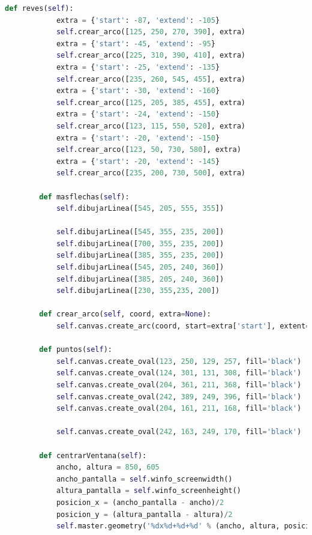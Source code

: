 \begin{lstlisting}[language=Python]
	    def reves(self):
	        extra = {'start': -87, 'extend': -105}
	        self.crear_arco([125, 250, 270, 390], extra)
	        extra = {'start': -45, 'extend': -95}
	        self.crear_arco([225, 310, 390, 410], extra)
	        extra = {'start': -25, 'extend': -135}
	        self.crear_arco([235, 260, 545, 455], extra)
	        extra = {'start': -30, 'extend': -160}
	        self.crear_arco([125, 205, 385, 455], extra)
	        extra = {'start': -24, 'extend': -150}
	        self.crear_arco([123, 115, 550, 520], extra)
	        extra = {'start': -20, 'extend': -150}
	        self.crear_arco([123, 50, 730, 580], extra)
	        extra = {'start': -20, 'extend': -145}
	        self.crear_arco([235, 200, 730, 500], extra)

	    def masflechas(self):
	        self.dibujarLinea([545, 205, 555, 355])

	        self.dibujarLinea([545, 355, 235, 200])
	        self.dibujarLinea([700, 355, 235, 200])
	        self.dibujarLinea([385, 355, 235, 200])
	        self.dibujarLinea([545, 205, 240, 360])
	        self.dibujarLinea([385, 205, 240, 360])
	        self.dibujarLinea([230, 355,235, 200])

	    def crear_arco(self, coord, extra=None):
	        self.canvas.create_arc(coord, start=extra['start'], extent=extra['extend'], style='arc')

	    def puntos(self):
	        self.canvas.create_oval(123, 250, 129, 257, fill='black')
	        self.canvas.create_oval(124, 301, 131, 308, fill='black')
	        self.canvas.create_oval(204, 361, 211, 368, fill='black')
	        self.canvas.create_oval(242, 389, 249, 396, fill='black')
	        self.canvas.create_oval(204, 161, 211, 168, fill='black')

	        self.canvas.create_oval(242, 163, 249, 170, fill='black')

	    def centrarVentana(self):
	        ancho, altura = 850, 605
	        ancho_pantalla = self.winfo_screenwidth()
	        altura_pantalla = self.winfo_screenheight()
	        posicion_x = (ancho_pantalla - ancho)/2
	        posicion_y = (altura_pantalla - altura)/2
	        self.master.geometry('%dx%d+%d+%d' % (ancho, altura, posicion_x, posicion_y))

	\end{lstlisting}
